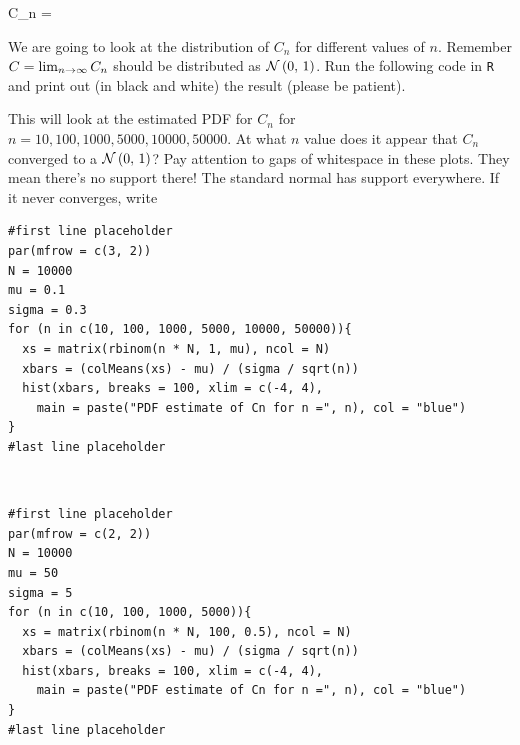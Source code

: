 \documentclass[12pt]{article}
\begin{document}
\begin{enumerate}
{\beqn
C_n =  
\eeqn

We are going to look at the distribution of $C_n$ for different values of $n$. Remember $C = \lim_{n \rightarrow \infty} C_n$ should be distributed as $\mathcal{N}\left(0,\,1\right)$. Run the following code in \texttt{R} and print out (in black and white) the result (please be patient).

This will look at the estimated PDF for $C_n$ for $n = 10, 100, 1000, 5000, 10000, 50000$. At what $n$ value does it appear that $C_n$ converged to a $\mathcal{N}\left(0,\,1\right)$? Pay attention to gaps of whitespace in these plots. They mean there's no support there! The standard normal has support everywhere. If it never converges, write  }

\begin{verbatim}
#first line placeholder
par(mfrow = c(3, 2))
N = 10000
mu = 0.1
sigma = 0.3
for (n in c(10, 100, 1000, 5000, 10000, 50000)){
  xs = matrix(rbinom(n * N, 1, mu), ncol = N)
  xbars = (colMeans(xs) - mu) / (sigma / sqrt(n))
  hist(xbars, breaks = 100, xlim = c(-4, 4), 
    main = paste("PDF estimate of Cn for n =", n), col = "blue")
}
#last line placeholder
\end{verbatim}
~



\begin{verbatim}
#first line placeholder
par(mfrow = c(2, 2))
N = 10000
mu = 50
sigma = 5
for (n in c(10, 100, 1000, 5000)){
  xs = matrix(rbinom(n * N, 100, 0.5), ncol = N)
  xbars = (colMeans(xs) - mu) / (sigma / sqrt(n))
  hist(xbars, breaks = 100, xlim = c(-4, 4), 
    main = paste("PDF estimate of Cn for n =", n), col = "blue")
}
#last line placeholder
\end{verbatim}~


\end{enumerate}
\end{document}
